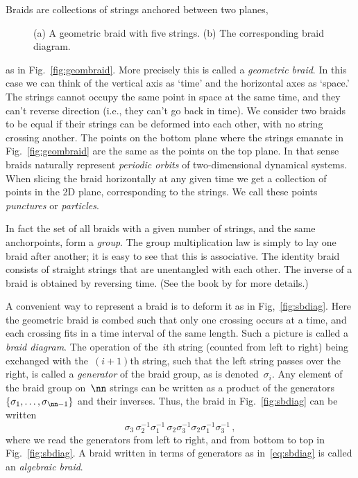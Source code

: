 \documentclass[12pt]{article}
\begin{document}
%
%
Braids are collections of strings anchored between two planes,
%
\begin{figure}
  \begin{center}
    \hspace{.25\textwidth}
  \end{center}
  \caption{(a) A geometric braid with five strings.  (b) The corresponding
    braid diagram.}
\end{figure}
%
as in Fig.~\ref{fig:geombraid}.  More precisely this is called a
\emph{geometric braid}.  In this case we can think of the vertical axis as
`time' and the horizontal axes as `space.'  The strings cannot occupy the same
point in space at the same time, and they can't reverse direction (i.e., they
can't go back in time).  We consider two braids to be equal if their strings
can be deformed into each other, with no string crossing another.  The points
on the bottom plane where the strings emanate in Fig.~\ref{fig:geombraid} are
the same as the points on the top plane.  In that sense braids naturally
represent \emph{periodic orbits} of two-dimensional dynamical systems.  When
slicing the braid horizontally at any given time we get a collection of points
in the 2D plane, corresponding to the strings.  We call these points
\emph{punctures} or \emph{particles}. %

In fact the set of all braids with a given number of strings, and the same
anchorpoints, form a \emph{group}.  The group multiplication law is simply to
lay one braid after another; it is easy to see that this is associative.  The
identity braid consists of straight strings that are unentangled with each
other.  The inverse of a braid is obtained by reversing time.  (See the book
by \citeauthor{Birman1975} for more details.)  %

%
A convenient way to represent a braid is to deform it %
as in Fig,~\ref{fig:sbdiag}.  Here the geometric braid is combed such that
only one crossing occurs at a time, and each crossing fits in a time interval
of the same length.  Such a picture is called a \emph{braid diagram}.  The
operation of the~$i$th string (counted from left to right) being exchanged
with the~$(i+1)$th string, such that the left string passes over the right, is
called a %
%
\emph{generator} of the braid group, as is denoted~$\sigma_i$.  Any element of
the braid group on~$\nn$ strings can be written as a product of the
generators~$\{\sigma_1,\ldots,\sigma_{\nn-1}\}$ and their inverses.  Thus, the
braid in Fig.~\ref{fig:sbdiag} can be written
\begin{equation}
  \sigma_3\,\sigma_2^{-1}\sigma_1^{-1}\,\sigma_2\sigma_3^{-1}
  \sigma_2\sigma_1^{-1}\sigma_3^{-1}\,,
  \label{eq:sbdiag}
\end{equation}
where we read the generators from left to right, and from bottom to top in
Fig.~\ref{fig:sbdiag}.  A braid written in terms of generators as
in~\eqref{eq:sbdiag} is called an \emph{algebraic braid}.
%
\end{document}
